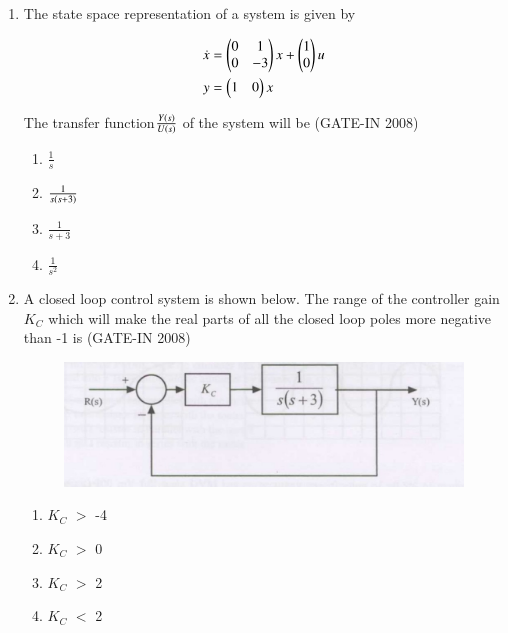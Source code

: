 \documentclass[journal,12pt,onecolumn]{IEEEtran}
\theoremstyle{remark}
\begin{document}
\begin{enumerate}
\item The state space representation of a system is given by \


\begin{align}
\dot{x} &= 
\begin{pmatrix}
0 & 1 \\
0 & -3
\end{pmatrix} x
+ 
\begin{pmatrix}
1 \\
0
\end{pmatrix} u
\\
y &= 
\begin{pmatrix}
1 & 0
\end{pmatrix} x
\end{align}


The transfer function$\frac{Y\left(s\right)}{U\left(s\right)}$ of the system will be \hfill{(GATE-IN 2008)}
\begin{multicols}{4}
           \begin{enumerate} 
              \item $\frac{1}{s}$           
              \item $\frac{1}{s\left(s+3\right)}$
              \item $\frac{1}{s+3}$
              \item $\frac{1}{s^2}$
            \end{enumerate}
            \end{multicols}

            
\item  A closed loop control system is shown below.  The range of the controller gain $K_{C}$  which will
make the real parts of all the closed loop poles more negative than -1 is \hfill{(GATE-IN 2008)}
\begin{figure}[H]
    \centering
    \includegraphics[width=0.5\columnwidth]{figs/i30.jpg}
    \caption{}
    \label{fig:placeholder30}
\end{figure}
\begin{multicols}{4}
           \begin{enumerate} 
              \item $K_C$ $>$ -4         
              \item $K_C$ $>$ 0
              \item $K_C$ $>$ 2
              \item $K_C$ $<$ 2
            \end{enumerate}
            \end{multicols}



\end{enumerate}
\end{document}
